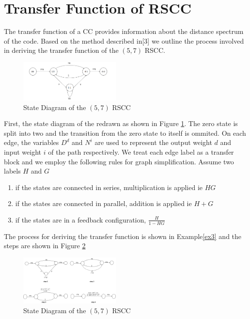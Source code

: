 \documentclass[conference]{IEEEtran}
\begin{document}
\section{Transfer Function of RSCC}
\label{sec7}
The transfer function of a CC provides information about the distance spectrum of the code. Based on the method described in[3] we outline the process involved in deriving the transfer function of the $(5,7)$ RSCC. 

\begin{figure}[h]
\centering
		\includegraphics[width=0.45\textwidth]{tf.png}
		\caption{State Diagram of the $(5,7)$ RSCC }
		\label{fig4}
		\end{figure}
First, the state diagram of the redrawn as shown in Figure \ref{fig4}. The zero state is split into two and the transition from the zero state to itself is ommited. On each edge, the variables $D^d$ and $N^i$ are used to represent the output weight $d$ and input weight $i$ of the path respectively. We treat each edge label as a transfer block and we employ the following rules for graph simplification. Assume two labels $H$ and $G$ 

\begin{enumerate}
\item if the states are connected in series, multiplication is applied ie $HG$

\item if the states are connected in parallel, addition is applied ie $H+G$

\item if the states are in a feedback configuration, $\frac{H}{1-HG}$
\end{enumerate}

The process for deriving the transfer function is shown in Example{\ref{ex3}} and the steps are shown in Figure \ref{fig5}

\begin{figure}[h]
\centering
		\includegraphics[width=0.45\textwidth]{tfexample.png}
		\caption{State Diagram of the $(5,7)$ RSCC }
		\label{fig5}
		\end{figure}
\end{document}
